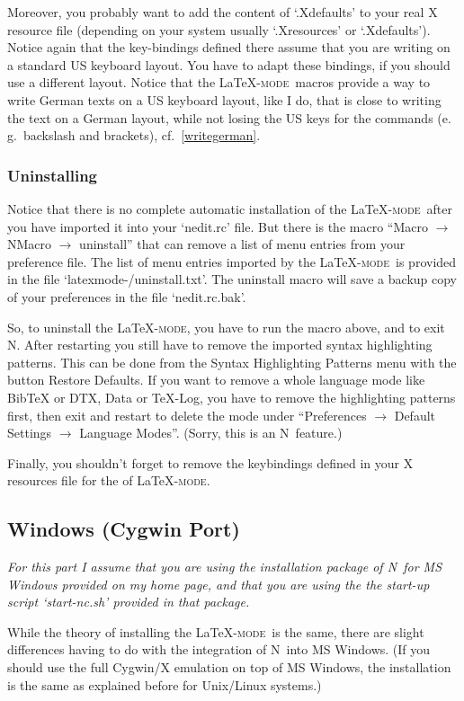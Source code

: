 \documentclass{article}
\newcommand{\latexpack}{\LaTeX-\textsc{mode}}
\newcommand{\nedit}{N\kern-0.8pt{Edit}}
\newcommand{\file}[1]{`#1'}
\newcommand{\menu}[1]{``#1''}
\begin{document}
Moreover, you probably want to add the content of \file{.Xdefaults} to your real X resource file (depending on your system usually \file{.Xresources} or \file{.Xdefaults}). Notice again that the key-bindings defined there assume that you are writing on a standard US keyboard layout. You have to adapt these bindings, if you should use a different layout. Notice that the \latexpack\ macros provide a way to write German texts on a US keyboard layout, like I do, that is close to writing the text on a German layout, while not losing the US keys for the commands (e.\,g.~backslash and brackets), cf.~\ref{writegerman}. 
\subsubsection{Uninstalling} 
Notice that there is no complete automatic installation of the \latexpack\ after you have imported it into your \file{nedit.rc} file. But there is the macro \menu{Macro $\to$ NMacro $\to$ uninstall} that can remove a list of menu entries from your preference file. The list of menu entries imported by the \latexpack\ is provided in the file \file{latexmode-\lversion/uninstall.txt}. The uninstall macro will save a backup copy of your preferences in the file \file{nedit.rc.bak}.

So, to uninstall the \latexpack, you have to run the macro above, and to exit \nedit. After restarting you still have to remove the imported syntax highlighting patterns. This can be done from the Syntax Highlighting Patterns menu with the button Restore Defaults. If you want to remove a whole language mode like BibTeX or DTX, Data or TeX-Log, you have to remove the highlighting patterns first, then exit and restart to delete the mode under \menu{Preferences $\to$ Default Settings $\to$ Language Modes}. (Sorry, this is an \nedit\ feature.) 

Finally, you shouldn't forget to remove the keybindings defined in your X resources file for the of \latexpack.

  
\subsection{Windows (Cygwin Port)}\label{instcyg}
\emph{For this part I assume that you are using the installation package of \nedit\ for MS Windows provided on my home page, and that you are using the the start-up script \file{start-nc.sh} provided in that package.} 

While the theory of installing the \latexpack\ is the same, there are slight differences having to do with the integration of \nedit\ into MS Windows. (If you should use the full Cygwin/X emulation on top of MS Windows, the installation is the same as explained before for Unix/Linux systems.)
\end{document}
